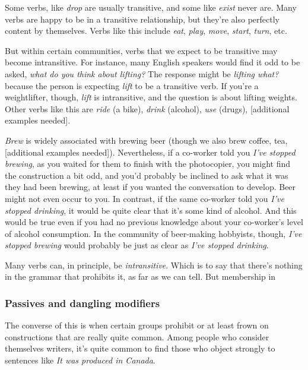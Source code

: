             Some verbs, like \textit{drop} are usually transitive, and some like \textit{exist} never are. Many verbs are happy to be in a transitive relationship, but they're also perfectly content by themselves. Verbs like this include \textit{eat}, \textit{play}, \textit{move}, \textit{start}, \textit{turn}, etc.
            
            But within certain communities, verbs that we expect to be transitive may become intransitive. For instance, many English speakers would find it odd to be asked, \textit{what do you think about lifting?} The response might be \textit{lifting what?} because the person is expecting \textit{lift} to be a transitive verb. If you're a weightlifter, though, \textit{lift} is intransitive, and the question is about lifting weights. Other verbs like this are \textit{ride} (a bike), \textit{drink} (alcohol), \textit{use} (drugs), [additional examples needed].
            
            \textit{Brew} is widely associated with brewing beer (though we also brew coffee, tea, [additional examples needed]). Nevertheless, if a co-worker told you \textit{I've stopped brewing}, as you waited for them to finish with the photocopier, you might find the construction a bit odd, and you'd probably be inclined to ask what it was they had been brewing, at least if you wanted the conversation to develop. Beer might not even occur to you. In contrast, if the same co-worker told you \textit{I've stopped drinking}, it would be quite clear that it's some kind of alcohol. And this would be true even if you had no previous knowledge about your co-worker's level of alcohol consumption. In the community of beer-making hobbyists, though, \textit{I've stopped brewing} would probably be just as clear as \textit{I've stopped drinking}.
    
            Many verbs can, in principle, be \textit{intransitive}. Which is to say that there's nothing in the grammar that prohibits it, as far as we can tell. But membership in 

        \subsubsection*{Passives and dangling modifiers}
    
            The converse of this is when certain groups prohibit or at least frown on constructions that are really quite common. Among people who consider themselves writers, it's quite common to find those who object strongly to sentences like \textit{It was produced in Canada}.
            
